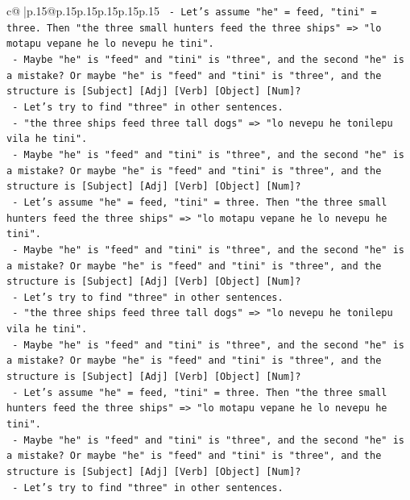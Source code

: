 \documentclass{article}
\begin{document}
{\begin{supertabular}{c@{$\;$}|p{.15\linewidth}@{}p{.15\linewidth}p{.15\linewidth}p{.15\linewidth}p{.15\linewidth}p{.15\linewidth}}
{{{\texttt{             {-} Let's assume "he" = feed, "tini" = three. Then "the three small hunters feed the three ships" => "lo motapu vepane he lo nevepu he tini".} \\
\texttt{             {-} Maybe "he" is "feed" and "tini" is "three", and the second "he" is a mistake? Or maybe "he" is "feed" and "tini" is "three", and the structure is {[}Subject{]} {[}Adj{]} {[}Verb{]} {[}Object{]} {[}Num{]}?} \\
\texttt{             {-} Let's try to find "three" in other sentences.} \\
\texttt{             {-} "the three ships feed three tall dogs" => "lo nevepu he tonilepu vila he tini".} \\
\texttt{             {-} Maybe "he" is "feed" and "tini" is "three", and the second "he" is a mistake? Or maybe "he" is "feed" and "tini" is "three", and the structure is {[}Subject{]} {[}Adj{]} {[}Verb{]} {[}Object{]} {[}Num{]}?} \\
\texttt{             {-} Let's assume "he" = feed, "tini" = three. Then "the three small hunters feed the three ships" => "lo motapu vepane he lo nevepu he tini".} \\
\texttt{             {-} Maybe "he" is "feed" and "tini" is "three", and the second "he" is a mistake? Or maybe "he" is "feed" and "tini" is "three", and the structure is {[}Subject{]} {[}Adj{]} {[}Verb{]} {[}Object{]} {[}Num{]}?} \\
\texttt{             {-} Let's try to find "three" in other sentences.} \\
\texttt{             {-} "the three ships feed three tall dogs" => "lo nevepu he tonilepu vila he tini".} \\
\texttt{             {-} Maybe "he" is "feed" and "tini" is "three", and the second "he" is a mistake? Or maybe "he" is "feed" and "tini" is "three", and the structure is {[}Subject{]} {[}Adj{]} {[}Verb{]} {[}Object{]} {[}Num{]}?} \\
\texttt{             {-} Let's assume "he" = feed, "tini" = three. Then "the three small hunters feed the three ships" => "lo motapu vepane he lo nevepu he tini".} \\
\texttt{             {-} Maybe "he" is "feed" and "tini" is "three", and the second "he" is a mistake? Or maybe "he" is "feed" and "tini" is "three", and the structure is {[}Subject{]} {[}Adj{]} {[}Verb{]} {[}Object{]} {[}Num{]}?} \\
\texttt{             {-} Let's try to find "three" in other sentences.} \\
}}}
\end{supertabular}}
\end{document}
